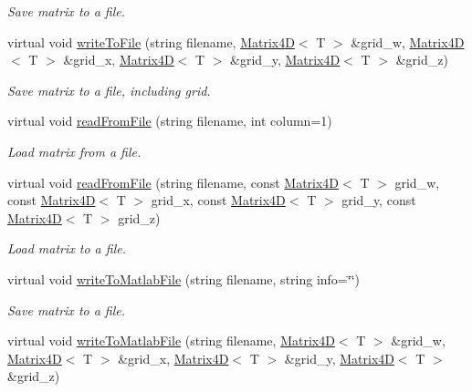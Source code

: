 \begin{DoxyCompactItemize}
\begin{DoxyCompactList}\small\item\em Save matrix to a file. \end{DoxyCompactList}\item 
virtual void \hyperlink{class_matrix4_d_a23f97dbe489ac6ca769718ae85c0ca6f}{write\+To\+File} (string filename, \hyperlink{class_matrix4_d}{Matrix4\+D}$<$ T $>$ \&grid\+\_\+w, \hyperlink{class_matrix4_d}{Matrix4\+D}$<$ T $>$ \&grid\+\_\+x, \hyperlink{class_matrix4_d}{Matrix4\+D}$<$ T $>$ \&grid\+\_\+y, \hyperlink{class_matrix4_d}{Matrix4\+D}$<$ T $>$ \&grid\+\_\+z)
\begin{DoxyCompactList}\small\item\em Save matrix to a file, including grid. \end{DoxyCompactList}\item 
virtual void \hyperlink{class_matrix4_d_af5fcef655a9a8ca3efb0f9e653080abb}{read\+From\+File} (string filename, int column=1)
\begin{DoxyCompactList}\small\item\em Load matrix from a file. \end{DoxyCompactList}\item 
virtual void \hyperlink{class_matrix4_d_aa8be7ad88a70143d037472811bda825c}{read\+From\+File} (string filename, const \hyperlink{class_matrix4_d}{Matrix4\+D}$<$ T $>$ grid\+\_\+w, const \hyperlink{class_matrix4_d}{Matrix4\+D}$<$ T $>$ grid\+\_\+x, const \hyperlink{class_matrix4_d}{Matrix4\+D}$<$ T $>$ grid\+\_\+y, const \hyperlink{class_matrix4_d}{Matrix4\+D}$<$ T $>$ grid\+\_\+z)
\begin{DoxyCompactList}\small\item\em Load matrix to a file. \end{DoxyCompactList}\item 
virtual void \hyperlink{class_matrix4_d_aa4a2e0586327e772f83b6e377b9f31f4}{write\+To\+Matlab\+File} (string filename, string info=\char`\"{}\char`\"{})
\begin{DoxyCompactList}\small\item\em Save matrix to a file. \end{DoxyCompactList}\item 
virtual void \hyperlink{class_matrix4_d_abb235654193dbc4e9d0f12e360e65f9d}{write\+To\+Matlab\+File} (string filename, \hyperlink{class_matrix4_d}{Matrix4\+D}$<$ T $>$ \&grid\+\_\+w, \hyperlink{class_matrix4_d}{Matrix4\+D}$<$ T $>$ \&grid\+\_\+x, \hyperlink{class_matrix4_d}{Matrix4\+D}$<$ T $>$ \&grid\+\_\+y, \hyperlink{class_matrix4_d}{Matrix4\+D}$<$ T $>$ \&grid\+\_\+z)

\end{DoxyCompactItemize}
